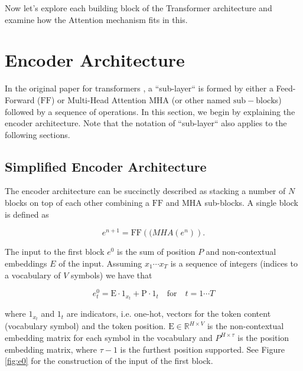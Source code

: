 Now let's explore each building block of the Transformer architecture and examine how the Attention mechanism fits in this.



\section{Encoder Architecture}\label{sec:enc}

In the original paper for transformers \citep{vaswani2017attention}, a ``sub-layer`` is formed by either a Feed-Forward ($\mathrm{FF}$) or Multi-Head Attention $\mathrm{MHA}$ (or other named $\mathrm{sub-block}$s) followed by a sequence of operations. In this section, we begin by explaining the encoder architecture. Note that the notation of ``sub-layer`` also applies to the following sections.

\subsection{Simplified Encoder Architecture}

The encoder architecture can be succinctly described as stacking a number of $N$ blocks on top of each other combining a $\mathrm{FF}$ and $\mathrm{MHA}$ sub-blocks. A single block is defined as

\begin{equation}
e^{n+1} = \mathrm{FF}(\mathrm(MHA(e^n)).
\end{equation}

The input to the first block $e^0$ is the sum of position $P$ and non-contextual embeddings $E$ of the input. Assuming $x_1 \cdots x_T$ is a sequence of integers (indices to a vocabulary of $V$ symbols) we have that

\begin{equation}
e^{0}_t = \mathrm{E} \cdot \mathrm{1}_{x_t} + \mathrm{P} \cdot \mathrm{1}_t \quad \mbox{for} \quad t=1 \cdots T
\end{equation}

where $\mathrm{1}_{x_t}$ and $\mathrm{1}_t$ are indicators, i.e. one-hot, vectors for the token content (vocabulary symbol) and the token position. $\mathrm{E} \in \mathbb{R}^{H \times V}$ is the non-contextual embedding matrix for each symbol in the vocabulary and $P^{H \times \tau}$ is the position embedding matrix, where  $\tau-1$ is the furthest position supported. See Figure \ref{fig:e0} for the construction of the input of the first block. \\



